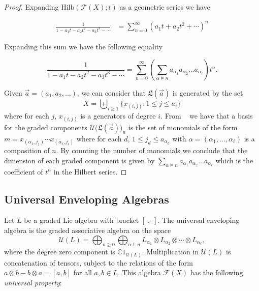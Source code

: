 \documentclass[11pt]{amsart}
\theoremstyle{definition}
\numberwithin{equation}{section}
\def\CC{{\mathbb C}}
\newcommand{\lucas}[1]{\todo[size=\tiny,color=red]{#1 \\ \hfill --- Lucas}}
\begin{document}
\begin{proof}
%
%
%
    Expanding $\mathrm{Hilb}(\mathcal{F}(X); t)$ as a geometric series we have 

    $${\begin{split}
        \frac{1}{1 - a_{1}t - a_{2}t^{2} - a_{3}t^{3} - \cdots} &= \sum_{n=0}^\infty (a_1t+a_2t^2+\cdots)^n
    \end{split}}$$

    Expanding this sum we have the following equality

    $$\frac{1}{1 - a_{1}t - a_{2}t^{2} - a_{3}t^{3} - \cdots}=\sum_{n=0}^\infty \left(\sum_ {\alpha \models n} a_{\alpha_1} a_{\alpha_2} ... a_{\alpha_\ell} \right) t^n.$$

    Given $\Vec{a} = (a_{1}, a_{2}, \ldots)$, we can consider that $\mathfrak{L}(\Vec{a})$ is generated by the set
    $$X=\biguplus_{i \geq 1}\{x_{(i,j)}: 1 \leq j \leq a_i\}$$
     where for each $j$, $x_{(i,j)}$ is a generators of degree $i$. From ~\cite[Theorem 7 (Witt)]{jacobson2013lie} we have that a basis for the graded components $\mathcal{U}\big(\mathfrak{L}(\vec{a})\big)_n$ is the set of monomials of the form $m=x_{(\alpha_1,j_1)} \cdots x_{(\alpha_\ell,j_\ell)}$ where
     for each $d$, $1 \leq j_d \leq a_{\alpha_{d}}$ with $\alpha=(\alpha_1,\dots,\alpha_\ell)$ is a composition of $n$.
By counting the number of monomials we conclude that the dimension of each graded component is given by $\sum_ {\alpha \models n} a_{\alpha_1} a_{\alpha_2} ... a_{\alpha_\ell}$ which is the coefficient of $t^n$ in the Hilbert series.

\end{proof}

\subsection{Universal Enveloping Algebras}
\label{sec:envelopingalgebras}

Let $L$ be a graded Lie algebra with bracket $[\cdot, \cdot]$.  The universal enveloping algebra is the graded associative algebra on the space
\[
\mathcal{U}(L) = \bigoplus_{n \ge 0} \bigoplus_{\alpha \vDash n} L_{\alpha_{1}} \otimes L_{\alpha_{2}} \otimes \cdots \otimes L_{\alpha_{\ell}},
\]
where the degree zero component is $\CC 1_{\mathcal{U}(L)}$.  Multiplication in $\mathcal{U}(L)$ is concatenation of tensors, subject to the relations of the form $a \otimes b - b \otimes a = [a, b]$ for all $a, b \in L$.  This algebra $\mathcal{F}(X)$ has the following \emph{universal property}:
\end{document}
